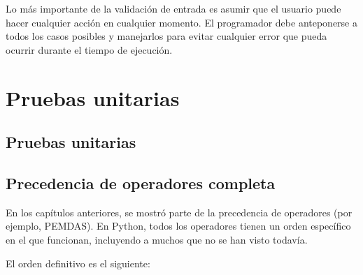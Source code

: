 \documentclass{report}
\begin{document}
Lo más importante de la validación de entrada es asumir que el usuario puede hacer cualquier acción en cualquier momento. El programador debe anteponerse a todos los casos posibles y manejarlos para evitar cualquier error que pueda ocurrir durante el tiempo de ejecución.


\clearpage\chapter{Pruebas unitarias}

\section{Pruebas unitarias}


\section{Precedencia de operadores completa}

En los capítulos anteriores, se mostró parte de la precedencia de operadores (por ejemplo, PEMDAS). En Python, todos los operadores tienen un orden específico en el que funcionan, incluyendo a muchos que no se han visto todavía.\smallskip

El orden definitivo es el siguiente:
\end{document}
